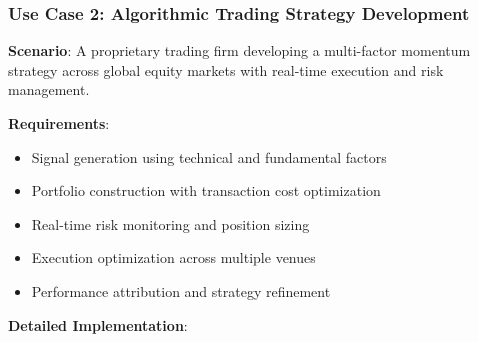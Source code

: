 \documentclass[12pt,a4paper]{article}
\theoremstyle{definition}
\theoremstyle{remark}
\begin{document}
\subsubsection{Use Case 2: Algorithmic Trading Strategy Development}

\textbf{Scenario}: A proprietary trading firm developing a multi-factor momentum strategy across global equity markets with real-time execution and risk management.

\textbf{Requirements}:
\begin{itemize}
    \item Signal generation using technical and fundamental factors
    \item Portfolio construction with transaction cost optimization
    \item Real-time risk monitoring and position sizing
    \item Execution optimization across multiple venues
    \item Performance attribution and strategy refinement
\end{itemize}

\textbf{Detailed Implementation}:
\end{document}
